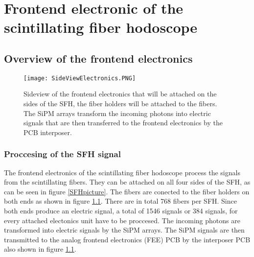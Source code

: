 \chapter{Frontend electronic of the scintillating fiber hodoscope}\label{cha:frontend}
\section{Overview of the frontend electronics}
\begin{figure}[h]
    \centering
    \texttt{[image: SideViewElectronics.PNG]}
    \caption{Sideview of the frontend electronics that will be attached on the sides of the SFH, the fiber holders will be attached to the fibers.
     The SiPM arrays transform the incoming photons into  electric signals that are then transferred to the frontend electronics by the PCB interposer.\autocite{InternalcommunicationKarl}}
    \label{fig:SideviewModelElectronics}
    \end{figure}
\subsection{Proccesing of the SFH signal}
The frontend electronics of the scintillating fiber hodoscope process the signals from the scintillating fibers.
They can be attached on all four sides of the SFH, as can be seen in figure \ref{SFHpicture}.
The fibers are conected to the fiber holders on both ends as shown in figure \ref{fig:SideviewModelElectronics}. 
There are in total 768\autocite{Amber2022Status} fibers per SFH. Since both ends produce an electric signal,
 a total of 1546 signals or 384 signals, for every attached electonics unit have to be proccesed.
 \newline
 The incoming photons are transformed into electric signals by the SiPM arrays.
 The SiPM signals are then transmitted to the analog frontend electronics (FEE) PCB by the interposer PCB also shown in figure \ref{fig:SideviewModelElectronics}.\autocite{InternalcommunicationKarl}
